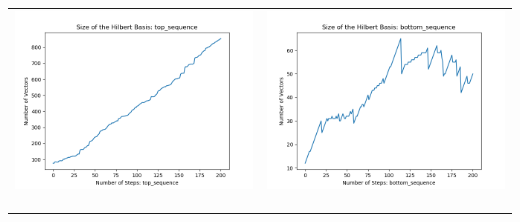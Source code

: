 \documentclass[10pt]{article}
\begin{document}
\begin{tabular}{c|c}
\begin{minipage}{.4\textwidth}
\includegraphics[width=\textwidth]{"DATA/5d/6 generators 2 bound F/top_sequence SIZE"}
\end{minipage} &
\begin{minipage}{.4\textwidth}
\includegraphics[width=\textwidth]{"DATA/5d/6 generators 2 bound F bottomup/bottom_sequence SIZE"}
\end{minipage} \\ \\
\hline \\\begin{minipage}{.4\textwidth}

\end{minipage}
\end{tabular}
\end{document}
